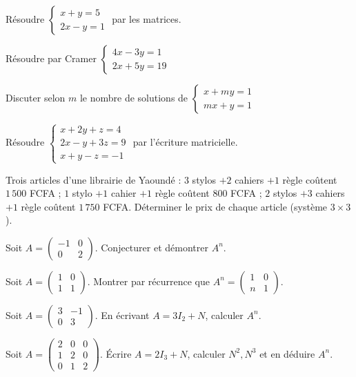 \exo{} Résoudre $\left\{\begin{array}{l}x+y=5\\ 2x-y=1\end{array}\right.$ par les matrices.

\exo{} Résoudre par Cramer $\left\{\begin{array}{l}4x-3y=1\\ 2x+5y=19\end{array}\right.$

\exo{} Discuter selon $m$ le nombre de solutions de
$\left\{\begin{array}{l}x+my=1\\ mx+y=1\end{array}\right.$

\exo{} Résoudre $\left\{\begin{array}{l}x+2y+z=4\\ 2x-y+3z=9\\ x+y-z=-1\end{array}\right.$
par l'écriture matricielle.

\exo{} Trois articles d'une librairie de Yaoundé : $3$ stylos $+2$ cahiers $+1$ règle coûtent
$1\,500$ FCFA ; $1$ stylo $+1$ cahier $+1$ règle coûtent $800$ FCFA ; $2$ stylos $+3$ cahiers
$+1$ règle coûtent $1\,750$ FCFA. Déterminer le prix de chaque article (système $3\times3$).

\exo{} Soit $A=\begin{pmatrix}-1&0\\0&2\end{pmatrix}$. Conjecturer et démontrer $A^n$.

\exo{} Soit $A=\begin{pmatrix}1&0\\1&1\end{pmatrix}$. Montrer par récurrence que
$A^n=\begin{pmatrix}1&0\\n&1\end{pmatrix}$.

\exo{} Soit $A=\begin{pmatrix}3&-1\\0&3\end{pmatrix}$. En écrivant $A=3I_2+N$, calculer $A^n$.

\exo{} Soit $A=\begin{pmatrix}2&0&0\\1&2&0\\0&1&2\end{pmatrix}$. Écrire $A=2I_3+N$, calculer
$N^2,N^3$ et en déduire $A^n$.

